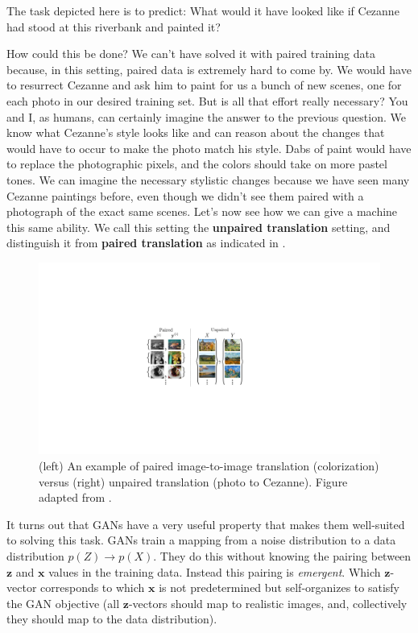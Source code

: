 The task depicted here is to predict: What would it have looked like if Cezanne had stood at this riverbank and painted it? %

How could this be done? We can't have solved it with paired training data because, in this setting, paired data is extremely hard to come by. We would have to resurrect Cezanne and ask him to paint for us a bunch of new scenes, one for each photo in our desired training set. But is all that effort really necessary? You and I, as humans, can certainly imagine the answer to the previous question. We know what Cezanne's style looks like and can reason about the changes that would have to occur to make the photo match his style. Dabs of paint would have to replace the photographic pixels, and the colors should take on more pastel tones. We can imagine the necessary stylistic changes because we have seen many Cezanne paintings before, even though we didn't see them paired with a photograph of the exact same scenes. Let's now see how we can give a machine this same ability. We call this setting the \textbf{unpaired translation} setting, and distinguish it from \textbf{paired translation} as indicated in \fig{\ref{fig:conditional_generative_models:paired_vs_unpaired}}.
\begin{figure}[h!]
    \centerline{
        \includegraphics[width=0.7\linewidth]{./figures/conditional_generative_models/paired_vs_unpaired.pdf}
    }
    \caption{(left) An example of paired image-to-image translation (colorization) versus (right) unpaired translation (photo to Cezanne). Figure adapted from \cite{CycleGAN2017}.}
    \label{fig:conditional_generative_models:paired_vs_unpaired}
\end{figure}

It turns out that GANs have a very useful property that makes them well-suited to solving this task. GANs train a mapping from a noise distribution to a data distribution $p(Z) \rightarrow p(X)$. They do this without knowing the pairing between $\mathbf{z}$ and $\mathbf{x}$ values in the training data. Instead this pairing is \textit{emergent}. Which $\mathbf{z}$-vector corresponds to which $\mathbf{x}$ is not predetermined but self-organizes to satisfy the GAN objective (all $\mathbf{z}$-vectors should map to realistic images, and, collectively they should map to the data distribution).

